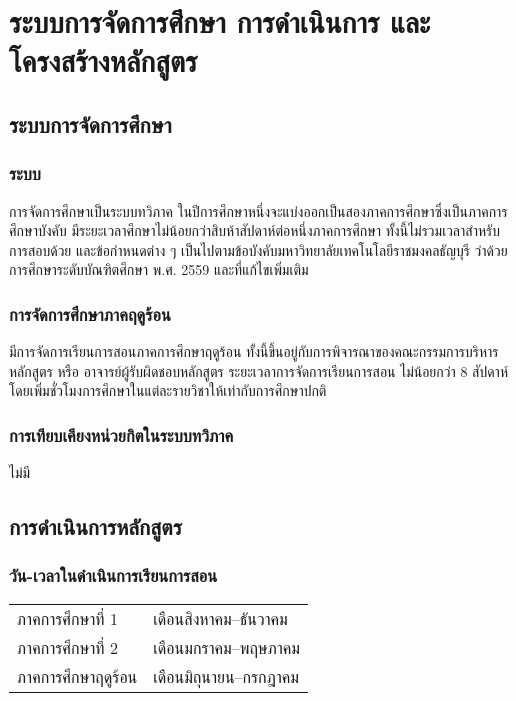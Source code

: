 \chapter{ระบบการจัดการศึกษา การดำเนินการ และโครงสร้างหลักสูตร}

\section{ระบบการจัดการศึกษา}
\subsection{ระบบ}
การจัดการศึกษาเป็นระบบทวิภาค ในปีการศึกษาหนึ่งจะแบ่งออกเป็นสองภาคการศึกษาซึ่งเป็นภาคการศึกษาบังคับ มีระยะเวลาศึกษาไม่น้อยกว่าสิบห้าสัปดาห์ต่อหนึ่งภาคการศึกษา 
ทั้งนี้ไม่รวมเวลาสำหรับการสอบด้วย และข้อกำหนดต่าง ๆ เป็นไปตามข้อบังคับมหาวิทยาลัยเทคโนโลยีราชมงคลธัญบุรี ว่าด้วยการศึกษาระดับบัณฑิตศึกษา พ.ศ. 2559  และที่แก้ไขเพิ่มเติม

\subsection{การจัดการศึกษาภาคฤดูร้อน}
มีการจัดการเรียนการสอนภาคการศึกษาฤดูร้อน ทั้งนี้ขึ้นอยู่กับการพิจารณาของคณะกรรมการบริหารหลักสูตร หรือ อาจารย์ผู้รับผิดชอบหลักสูตร  ระยะเวลาการจัดการเรียนการสอน          ไม่น้อยกว่า 8 สัปดาห์ โดยเพิ่มชั่วโมงการศึกษาในแต่ละรายวิชาให้เท่ากับการศึกษาปกติ

\subsection{การเทียบเคียงหน่วยกิตในระบบทวิภาค}
ไม่มี

\section{การดำเนินการหลักสูตร}
\subsection{วัน-เวลาในดำเนินการเรียนการสอน}

\begin{tabular}{p{}p{}}
ภาคการศึกษาที่ 1 &	เดือนสิงหาคม–ธันวาคม \\
ภาคการศึกษาที่ 2 &	เดือนมกราคม–พฤษภาคม \\
ภาคการศึกษาฤดูร้อน &	เดือนมิถุนายน–กรกฎาคม \\
\end{tabular}



